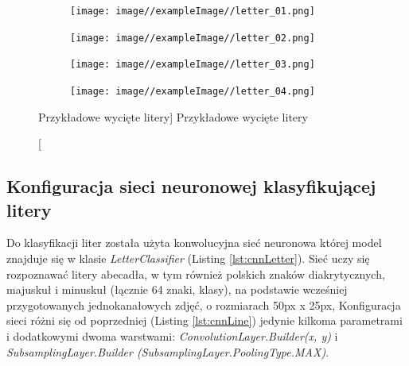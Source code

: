 \documentclass[a4paper,12pt]{article}
\newcommand\spacingIndent{2.2em}
\begin{document}
            \begin{figure}[h!]
                \centering
                \begin{subfigure}[b]{2cm}
                    \texttt{[image: image//exampleImage//letter\_01.png]}
                    \caption{}
                \end{subfigure}
                \begin{subfigure}[b]{2cm}
                    \texttt{[image: image//exampleImage//letter\_02.png]}
                \caption{}
                \end{subfigure}
                \newline
                \begin{subfigure}[b]{2cm}
                    \texttt{[image: image//exampleImage//letter\_03.png]}
                    \caption{}
                \end{subfigure}
                \begin{subfigure}[b]{2cm}
                    \texttt{[image: image//exampleImage//letter\_04.png]}
                    \caption{}
                \end{subfigure}
                \caption
                [Przykładowe wycięte litery]
                {Przykładowe wycięte litery}
            \end{figure}

        \subsection{Konfiguracja sieci neuronowej klasyfikującej litery}
            \hspace{\spacingIndent}  
            Do klasyfikacji liter została użyta konwolucyjna sieć neuronowa której model znajduje się w klasie \textit{LetterClassifier} (Listing \ref{lst:cnnLetter}). Sieć  
            uczy się rozpoznawać litery abecadła, w tym również polskich znaków     diakrytycznych, majuskuł i minuskuł (łącznie 64 znaki, klasy), na           podstawie wcześniej przygotowanych jednokanałowych zdjęć,     o rozmiarach 50px x 25px, Konfiguracja sieci różni się od poprzedniej (Listing \ref{lst:cnnLine})    jedynie kilkoma parametrami i dodatkowymi dwoma warstwami:                  \textit{ConvolutionLayer.Builder(x, y)} i  \textit{SubsamplingLayer.Builder (SubsamplingLayer.PoolingType.MAX)}.
	       \newpage
	       
            
\end{document}

